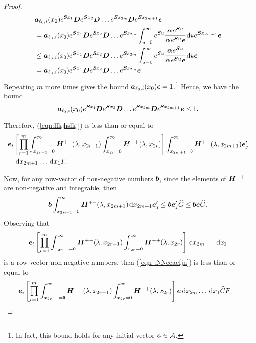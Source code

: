 \begin{proof}
	\begin{align*}
		&\boldsymbol a_{\ell_0,i}(x_0)e^{\boldsymbol{S}x_1} \boldsymbol{D}e^{\boldsymbol{S}x_2} \boldsymbol{D}\dots e^{\boldsymbol{S}x_{2m}} \boldsymbol{D}e^{\boldsymbol{S}x_{2m+1}}{\boldsymbol e}
		\\& = \boldsymbol a_{\ell_0,i}(x_0)e^{\boldsymbol{S}x_1} \boldsymbol{D}e^{\boldsymbol{S}x_2} \boldsymbol{D}\dots e^{\boldsymbol{S}x_{2m}} \int_{u=0}^\infty e^{\boldsymbol Su}\cfrac{\boldsymbol \alpha e^{\boldsymbol Su}}{\boldsymbol \alpha e^{\boldsymbol Su}\boldsymbol e}\, \mathrm{d} u e^{\boldsymbol{S}x_{2m+1}}{\boldsymbol e}
		\\&\leq \boldsymbol a_{\ell_0,i}(x_0)e^{\boldsymbol{S}x_1} \boldsymbol{D}e^{\boldsymbol{S}x_2} \boldsymbol{D}\dots e^{\boldsymbol{S}x_{2m}} \int_{u=0}^\infty e^{\boldsymbol Su}\cfrac{\boldsymbol \alpha e^{\boldsymbol Su}}{\boldsymbol \alpha e^{\boldsymbol Su}\boldsymbol e}\, \mathrm{d} u {\boldsymbol e}
		\\&=\boldsymbol a_{\ell_0,i}(x_0)e^{\boldsymbol{S}x_1} \boldsymbol{D}e^{\boldsymbol{S}x_2} \boldsymbol{D}\dots e^{\boldsymbol{S}x_{2m}} \boldsymbol e.
	\end{align*}
	Repeating \(m\) more times gives the bound \(\boldsymbol a_{\ell_0,i}(x_0)\boldsymbol e=1\).\footnote{In fact, this bound holds for any initial vector \(\boldsymbol a \in\mathcal A\).} Hence, we have the bound 
	\[\boldsymbol a_{\ell_0,i}(x_0)e^{\boldsymbol{S}x_1} \boldsymbol{D}e^{\boldsymbol{S}x_2} \boldsymbol{D}\dots e^{\boldsymbol{S}x_{2m}} \boldsymbol{D}e^{\boldsymbol{S}x_{2m+1}}{\boldsymbol e}\leq 1.\]

    Therefore, (\ref{eqn:llkjhslkj}) is less than or equal to 
	\begin{align}
		& \boldsymbol e_i \left[\prod_{r=1}^m\int_{x_{2r-1}=0}^\infty \boldsymbol H^{+-}(\lambda,x_{2r-1})\nonumber
		\int_{x_{2r}=0}^\infty \boldsymbol H^{-+}(\lambda,x_{2r}) \right]
		\int_{x_{2m+1}=0}^\infty \boldsymbol H^{++}(\lambda,x_{2m+1}) \boldsymbol e_j'{}
		\\&\quad \, \mathrm{d} x_{2m+1} \dots \, \mathrm{d} x_1 F. \label{eqn :NNeeaefjn}
	\end{align}

	Now, for any row-vector of non-negative numbers \(\boldsymbol b\), since the elements of \(\boldsymbol H^{++}\) are non-negative and integrable, then 
	\[\boldsymbol b \int_{x_{2m+1}=0}^\infty \boldsymbol H^{++}(\lambda, x_{2m+1})\, \mathrm{d} x_{2m+1} \boldsymbol e_j'{} \leq \boldsymbol b \boldsymbol e_j'{} \widehat G\leq \boldsymbol b \boldsymbol e \widehat G.\]
	Observing that  
	\[\boldsymbol e_i \left[\prod_{r=1}^m\int_{x_{2r-1}=0}^\infty \boldsymbol H^{+-}(\lambda,x_{2r-1})\nonumber
	\int_{x_{2r}=0}^\infty \boldsymbol H^{-+}(\lambda,x_{2r}) \right]
	\, \mathrm{d} x_{2m}\dots \, \mathrm{d} x_1\] 
	is a row-vector non-negative numbers, then (\ref{eqn :NNeeaefjn}) is less than or equal to 
	\begin{align}
		&\boldsymbol e_i \left[\prod_{r=1}^m\int_{x_{2r-1}=0}^\infty \boldsymbol H^{+-}(\lambda,x_{2r-1})
		\int_{x_{2r}=0}^\infty \boldsymbol H^{-+}(\lambda,x_{2r}) \right]
		\boldsymbol e\, \mathrm{d} x_{2m}\dots \, \mathrm{d} x_1\widehat G F\label{eqn :NNeeaefjn12}
	\end{align}


\end{proof}
